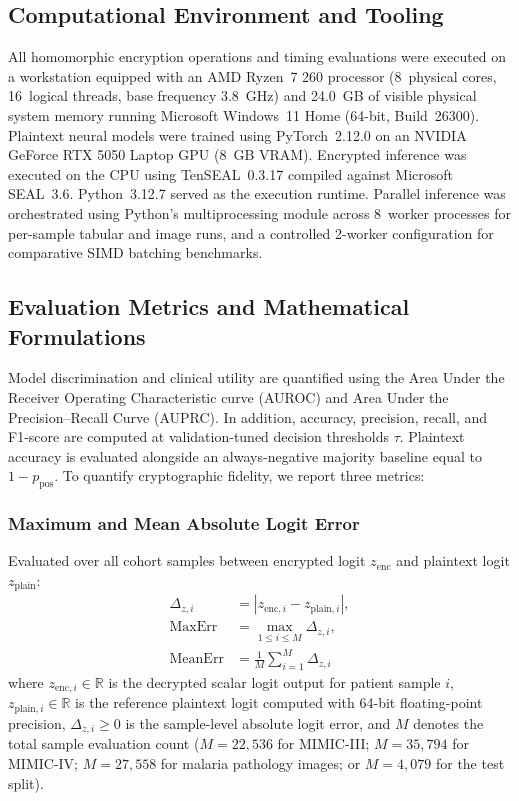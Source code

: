 \documentclass[conference]{IEEEtran}
\begin{document}
\subsection{Computational Environment and Tooling}

All homomorphic encryption operations and timing evaluations were executed on a workstation equipped with an AMD Ryzen~7 260 processor (8~physical cores, 16~logical threads, base frequency 3.8~GHz) and 24.0~GB of visible physical system memory running Microsoft Windows~11 Home (64-bit, Build~26300). Plaintext neural models were trained using PyTorch~2.12.0 on an NVIDIA GeForce RTX 5050 Laptop GPU (8~GB VRAM). Encrypted inference was executed on the CPU using TenSEAL~0.3.17 compiled against Microsoft SEAL~3.6. Python~3.12.7 served as the execution runtime. Parallel inference was orchestrated using Python's multiprocessing module across 8~worker processes for per-sample tabular and image runs, and a controlled 2-worker configuration for comparative SIMD batching benchmarks.

\subsection{Evaluation Metrics and Mathematical Formulations}

Model discrimination and clinical utility are quantified using the Area Under the Receiver Operating Characteristic curve (AUROC) and Area Under the Precision--Recall Curve (AUPRC). In addition, accuracy, precision, recall, and F1-score are computed at validation-tuned decision thresholds $\tau$. Plaintext accuracy is evaluated alongside an always-negative majority baseline equal to $1 - p_{\mathrm{pos}}$. To quantify cryptographic fidelity, we report three metrics:

\subsubsection{Maximum and Mean Absolute Logit Error}
Evaluated over all cohort samples between encrypted logit $z_{\mathrm{enc}}$ and plaintext logit $z_{\mathrm{plain}}$:
\begin{equation}
\begin{aligned}
\Delta_{z,i} &= |z_{\mathrm{enc},i} - z_{\mathrm{plain},i}|, \\
\mathrm{MaxErr} &= \max_{1 \leq i \leq M} \Delta_{z,i}, \\
\mathrm{MeanErr} &= \frac{1}{M} \sum_{i=1}^{M} \Delta_{z,i}
\end{aligned}
\label{eq:logiterr}
\end{equation}
where $z_{\mathrm{enc},i} \in \mathbb{R}$ is the decrypted scalar logit output for patient sample $i$, $z_{\mathrm{plain},i} \in \mathbb{R}$ is the reference plaintext logit computed with 64-bit floating-point precision, $\Delta_{z,i} \geq 0$ is the sample-level absolute logit error, and $M$ denotes the total sample evaluation count ($M = 22{,}536$ for MIMIC-III; $M = 35{,}794$ for MIMIC-IV; $M = 27{,}558$ for malaria pathology images; or $M = 4{,}079$ for the test split).
\end{document}
